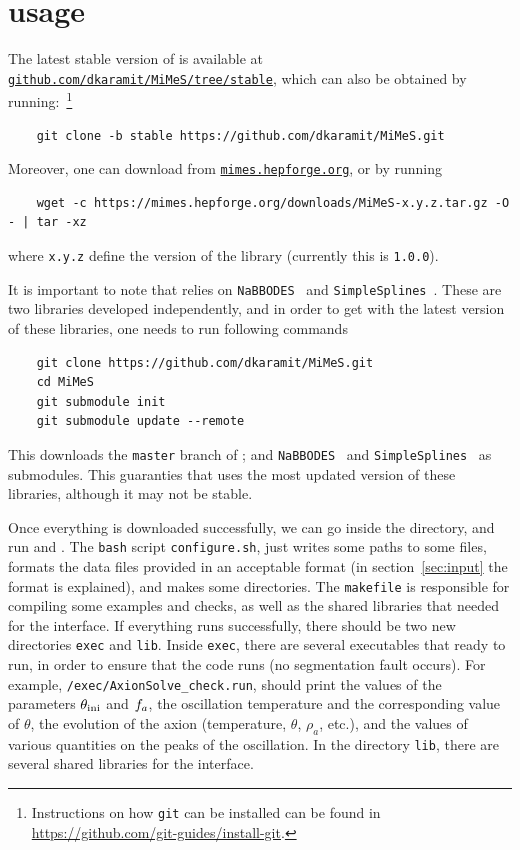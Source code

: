 \documentclass[11pt,a4paper]{article}
\begin{document}
\section{\mimes usage}\label{sec:first_steps}
\setcounter{equation}{0}
%
The latest stable version of \mimes is available at \href{https://github.com/dkaramit/MiMeS/tree/stable}{\tt github.com/dkaramit/MiMeS/tree/stable}, which can also be obtained by running:~\footnote{Instructions on how {\tt git} can be installed can be found in \href{https://github.com/git-guides/install-git}{https://github.com/git-guides/install-git}. }
%
\begin{lstlisting}
	git clone -b stable https://github.com/dkaramit/MiMeS.git
\end{lstlisting}
%
Moreover, one can download \mimes from \href{https://mimes.hepforge.org}{\tt mimes.hepforge.org}, or by running  
%
\begin{lstlisting}
	wget -c https://mimes.hepforge.org/downloads/MiMeS-x.y.z.tar.gz -O - | tar -xz
\end{lstlisting}
%
where {\tt x.y.z} define the version of the library (currently this is {\tt 1.0.0}).


It is important to note that \mimes relies on {\tt NaBBODES}~\cite{NaBBODES} and {\tt SimpleSplines}~\cite{SimpleSplines}. These are two libraries developed independently, and in order to get \mimes with the latest version of these libraries, one needs to run following commands
%
\begin{lstlisting}
	git clone https://github.com/dkaramit/MiMeS.git
	cd MiMeS
	git submodule init
	git submodule update --remote
\end{lstlisting}
%
This downloads the {\tt master} branch of \mimes; and {\tt NaBBODES}~\cite{NaBBODES} and {\tt SimpleSplines}~\cite{SimpleSplines} as submodules. This guaranties that \mimes uses the most updated version of these libraries, although it may not be stable. 



Once everything is downloaded successfully, we can go inside the \mimes directory, and run  and .  The {\tt bash} script {\tt configure.sh}, just writes some paths to some files, formats the data files provided in an acceptable format (in section~\ref{sec:input} the format is explained), and makes some directories.
%
The {\tt makefile} is responsible for compiling some examples and checks, as well as the shared libraries that needed for the \PY interface.  If everything runs successfully, there should be two new directories {\tt exec} and {\tt lib}. Inside {\tt exec}, there are several executables that ready to run, in order to ensure that the code runs (\eg no segmentation fault occurs). For example, {\tt \mimes/exec/AxionSolve\_check.run}, should print the values of the parameters $\theta_{\rm ini}{}$ and $f_{a}{}$, the oscillation temperature and the corresponding value of $\theta$, the evolution of the axion (\eg temperature, $\theta$, $\rho_{a}$, etc.), and the values of various quantities on the peaks of the oscillation.  In the directory {\tt lib}, there are several shared libraries for the \PY interface.
\end{document}

